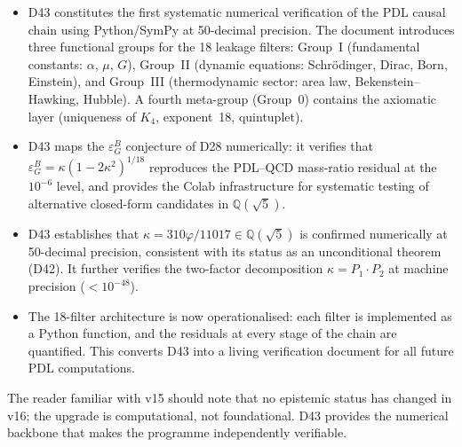 \documentclass[11pt,a4paper]{article}
\theoremstyle{plain}
\theoremstyle{definition}
\theoremstyle{remark}
\newcommand{\epsGeomB}{\varepsilon_G^B}
\begin{document}
\begin{itemize}
\item D43 constitutes the first systematic numerical verification of the PDL causal chain using Python/SymPy at 50-decimal precision. The document introduces three functional groups for the 18 leakage filters: Group~I (fundamental constants: $\alpha$, $\mu$, $G$), Group~II (dynamic equations: Schr\"odinger, Dirac, Born, Einstein), and Group~III (thermodynamic sector: area law, Bekenstein--Hawking, Hubble). A fourth meta-group (Group~0) contains the axiomatic layer (uniqueness of $K_4$, exponent~18, quintuplet).
\item D43 maps the $\epsGeomB$ conjecture of D28 numerically: it verifies that $\epsGeomB = \kappa(1 - 2\kappa^2)^{1/18}$ reproduces the PDL--QCD mass-ratio residual at the $10^{-6}$ level, and provides the Colab infrastructure for systematic testing of alternative closed-form candidates in $\mathbb{Q}(\sqrt{5})$.
\item D43 establishes that $\kappa = 310\varphi/11017 \in \mathbb{Q}(\sqrt{5})$ is confirmed numerically at 50-decimal precision, consistent with its status as an unconditional theorem (D42). It further verifies the two-factor decomposition $\kappa = P_1 \cdot P_2$ at machine precision ($< 10^{-48}$).
\item The 18-filter architecture is now operationalised: each filter is implemented as a Python function, and the residuals at every stage of the chain are quantified. This converts D43 into a living verification document for all future PDL computations.
\end{itemize}

The reader familiar with v15 should note that no epistemic status has changed in v16; the upgrade is computational, not foundational. D43 provides the numerical backbone that makes the programme independently verifiable.
\end{document}
